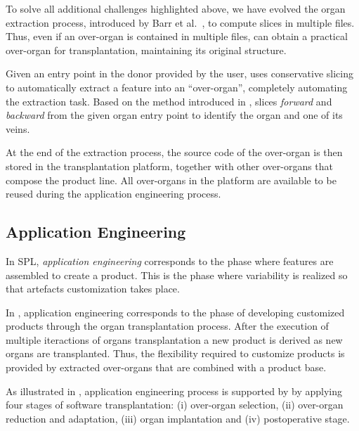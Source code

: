 To solve all additional challenges highlighted above, we have evolved the organ extraction process, introduced by Barr et al.~\cite{Barr2015}, to compute slices in multiple files. 
Thus, even if an over-organ is contained in multiple files, \FOUNDRY can obtain a practical over-organ for transplantation, maintaining its original structure. 

Given an entry point in the donor provided by the user, \FOUNDRY uses conservative slicing to automatically extract a feature into an ``over-organ'', completely automating the extraction task. Based on the method introduced in \cite{Barr2015}, \FOUNDRY slices \emph{forward} and \emph{backward} from the given organ entry point to identify the organ and one of its veins. 

At the end of the extraction process, the  source code of the over-organ is then stored in the transplantation platform, together with other over-organs that compose the product line. 
All over-organs in the platform are available to be reused during the application engineering process. 

\subsection{Application Engineering}
\label{sec:application_eng}

In SPL, \emph{application engineering} corresponds to the phase where features are assembled to create a product. This is the phase where variability is realized so that artefacts customization takes place.

In \FOUNDRY, application engineering corresponds to the phase of developing customized products through the organ transplantation process. 
After the execution of multiple iteractions of organs transplantation a new product is derived as new organs are transplanted. Thus, the flexibility required to customize products is provided by extracted over-organs that are combined with a product base.

As illustrated in , application engineering process is supported by \FOUNDRY by applying four stages of software transplantation: (i) over-organ selection, (ii) over-organ reduction and adaptation, (iii) organ implantation and (iv) postoperative stage. 


